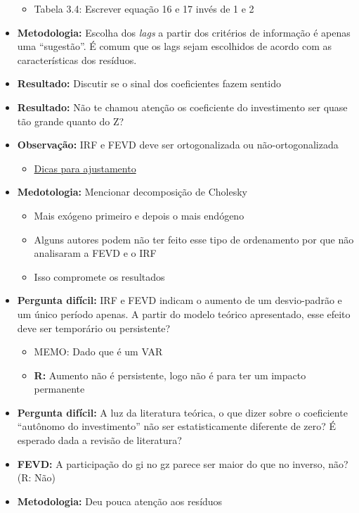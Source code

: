\documentclass[11pt]{article}
\begin{document}
\begin{itemize}
\begin{itemize}
\item Tabela 3.4: Escrever equação 16 e 17 invés de 1 e 2
\end{itemize}
\item \textbf{Metodologia:} Escolha dos \emph{lags} a partir dos critérios de informação é apenas uma ``sugestão''. É comum que os lags sejam escolhidos de acordo com as características dos resíduos.
\item \textbf{Resultado:} Discutir se o sinal dos coeficientes fazem sentido
\item \textbf{Resultado:} Não te chamou atenção os coeficiente do investimento ser quase tão grande quanto do Z?
\item \textbf{Observação:} IRF e FEVD deve ser ortogonalizada ou não-ortogonalizada
\begin{itemize}
\item \href{https://rpubs.com/hudsonchavs/varsvar}{Dicas para ajustamento}
\end{itemize}
\item \textbf{Medotologia:} Mencionar decomposição de Cholesky
\begin{itemize}
\item Mais exógeno primeiro e depois o mais endógeno
\item Alguns autores podem não ter feito esse tipo de ordenamento por que não analisaram a FEVD e o IRF
\item Isso compromete os resultados
\end{itemize}
\item \textbf{Pergunta difícil:} IRF e FEVD indicam o aumento de um desvio-padrão e um único período apenas. A partir do modelo teórico apresentado, esse efeito deve ser temporário ou persistente?
\begin{itemize}
\item MEMO: Dado que é um VAR
\item \textbf{R:} Aumento não é persistente, logo não é para ter um impacto permanente
\end{itemize}
\item \textbf{Pergunta difícil:} A luz da literatura teórica, o que dizer sobre o coeficiente ``autônomo do investimento'' não ser estatisticamente diferente de zero? É esperado dada a revisão de literatura?
\item \textbf{FEVD:} A participação do gi no gz parece ser maior do que no inverso, não? (R: Não)
\item \textbf{Metodologia:} Deu pouca atenção aos resíduos

\end{itemize}
\end{document}
